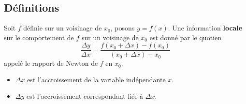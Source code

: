 \documentclass[
    11pt,
    a4paper,
    oneside,
    headinlcude, footinclude,
    twoside,
]{report}
\begin{document}
\subsection{Définitions}
\label{sub:definitions}

Soit $f$ définie sur un voisinage de $x_{0}$, posons $y = f(x)$. Une
information \textbf{locale} sur le comportement de $f$ sur un voisinage de $x_{0}$
est donné par le quotien $$\frac{\Delta y}{\Delta x} = \frac{f(x_{0} + \Delta x )
- f(x_{0})}{(x_{0} + \Delta x ) - x_{0}}$$
appelé le rapport de Newton de $f$ en $x_{0}$.

\begin{itemize}
    \item $\Delta x $ est l'accroissement de la variable indépendante $x$.
    \item $\Delta y$ est l'accroissement correspondant liée à $\Delta x $.


\end{itemize}
\end{document}
